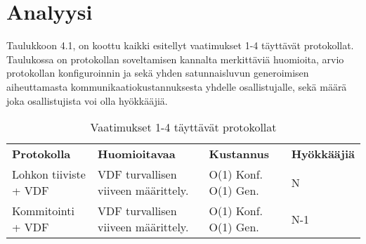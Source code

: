 \chapter{Analyysi\label{discussion}}



Taulukkoon 4.1, on koottu kaikki esitellyt vaatimukset 1-4 täyttävät protokollat. Taulukossa on protokollan soveltamisen kannalta merkittäviä huomioita, arvio protokollan konfiguroinnin ja sekä yhden satunnaisluvun generoimisen aiheuttamasta kommunikaatiokustannuksesta yhdelle osallistujalle, sekä määrä joka osallistujista voi olla hyökkääjiä.

\begin{table}[h]
    \caption{Vaatimukset 1-4 täyttävät protokollat}
    \label{crouch}
    \begin{tabular}{  l  p{5cm}  p{4cm} p{2cm} }
        \toprule
\textbf{Protokolla}      
& \textbf{Huomioitavaa}
& \textbf{Kustannus}
& \textbf{Hyökkääjiä} \\\longrule
Lohkon tiiviste + VDF 
& VDF turvallisen viiveen määrittely.        
& O(1) Konf. O(1) Gen.
& N \\\hline
Kommitointi + VDF       
& VDF turvallisen viiveen määrittely.                        
&  O(1) Konf. O(1) Gen.
& N-1  \\\hline
        \bottomrule
    \end{tabular}
\end{table}
